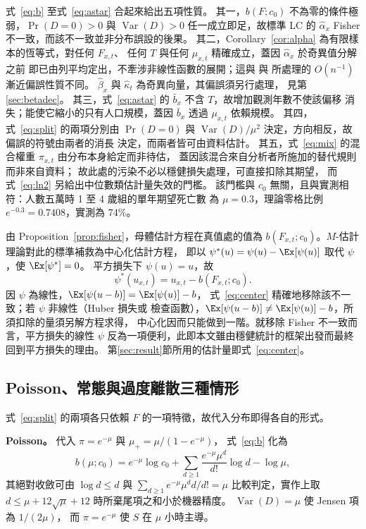 式~\eqref{eq:b} 至式~\eqref{eq:astar} 合起來給出五項性質。
其一，$b(F;c_0)$ 不為零的條件極弱，$\Pr(D=0)>0$ 與
$\operatorname{Var}(D)>0$ 任一成立即足，故標準 LC 的 $\hat\alpha_x$ Fisher
不一致，而該不一致並非分布誤設的後果。
其二，Corollary~\ref{cor:alpha} 為有限樣本的恆等式，對任何 $F_{x,t}$、
任何 $T$ 與任何 $\mu_{x,t}$ 精確成立，蓋因 $\hat\alpha_x$ 於奇異值分解之前
即已由列平均定出，不牽涉非線性函數的展開；這與 \citet{coxsnell1968} 與
\citet{firth1993} 所處理的 $O(n^{-1})$ 漸近偏誤性質不同。
$\hat\beta_x$ 與 $\hat\kappa_t$ 為奇異向量，其偏誤須另行處理，
見第\ref{sec:betadec}。
其三，式~\eqref{eq:astar} 的 $\bar b_x$ 不含 $T$，故增加觀測年數不使該偏移
消失；能使它縮小的只有人口規模，蓋因 $\bar b_x$ 透過 $\mu_{x,t}$ 依賴規模。
其四，式~\eqref{eq:split} 的兩項分別由 $\Pr(D=0)$ 與
$\operatorname{Var}(D)/\mu^{2}$ 決定，方向相反，故偏誤的符號由兩者的消長
決定，而兩者皆可由資料估計。
其五，式~\eqref{eq:mix} 的混合權重 $\pi_{x,t}$ 由分布本身給定而非待估，
蓋因該混合來自分析者所施加的替代規則而非來自資料；
故此處的污染不必以穩健損失處理，可直接扣除其期望，
而式~\eqref{eq:ln2} 另給出中位數類估計量失效的門檻。
該門檻與 $c_0$ 無關，且與實測相符：人數五萬時 1 至 4 歲組的單年期望死亡數
為 $\mu=0.3$，理論零格比例 $e^{-0.3}=0.7408$，實測為 $74\%$。

由 Proposition~\ref{prop:fisher}，母體估計方程在真值處的值為
$b(F_{x,t};c_0)$。$M$-估計理論對此的標準補救為中心化估計方程，
即以 $\psi^{*}(u)=\psi(u)-\Ex[\psi(u)]$ 取代 $\psi$，使 $\Ex[\psi^{*}]=0$。
平方損失下 $\psi(u)=u$，故
\begin{equation}\label{eq:center}
\psi^{*}(u_{x,t})=u_{x,t}-b(F_{x,t};c_0) .
\end{equation}
因 $\psi$ 為線性，$\Ex[\psi(u-b)]=\Ex[\psi(u)]-b$，
式~\eqref{eq:center} 精確地移除該不一致；若 $\psi$ 非線性（Huber 損失或
檢查函數），$\Ex[\psi(u-b)]\ne\Ex[\psi(u)]-b$，所須扣除的量須另解方程求得，
中心化因而只能做到一階。就移除 Fisher 不一致而言，平方損失的線性 $\psi$
反為一項便利，此即本文雖由穩健統計的框架出發而最終回到平方損失的理由。
第\ref{sec:result}節所用的估計量即式~\eqref{eq:center}。

\subsection{Poisson、常態與過度離散三種情形}\label{sec:normal}

式~\eqref{eq:split} 的兩項各只依賴 $F$ 的一項特徵，故代入分布即得各自的形式。

\textbf{Poisson。} 代入 $\pi=e^{-\mu}$ 與 $\mu_{+}=\mu/(1-e^{-\mu})$，
式~\eqref{eq:b} 化為
\begin{equation}\label{eq:bform}
b(\mu;c_0)=e^{-\mu}\log c_0
+\sum_{d\ge1}\frac{e^{-\mu}\mu^{d}}{d!}\log d-\log\mu ,
\end{equation}
其絕對收斂可由 $\log d\le d$ 與 $\sum_{d\ge1}e^{-\mu}\mu^{d}d/d!=\mu$
比較判定，實作上取 $d\le\mu+12\sqrt{\mu}+12$ 時所棄尾項之和小於機器精度。
$\operatorname{Var}(D)=\mu$ 使 Jensen 項為 $1/(2\mu)$，
而 $\pi=e^{-\mu}$ 使 $S$ 在 $\mu$ 小時主導。

